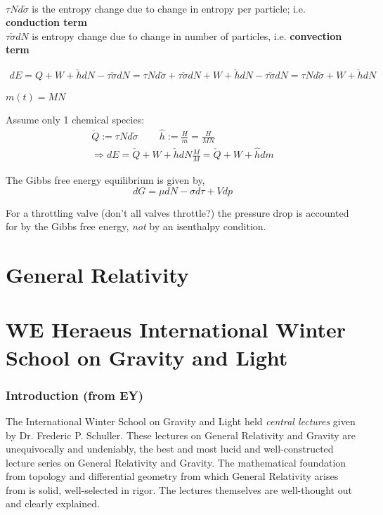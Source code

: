 \documentclass[10pt]{amsart}
\begin{document}
\begin{multicols*}{2}
\quad \\ 
$\tau N d\check{\sigma}$ is the entropy change due to change in entropy per particle; i.e. \textbf{conduction term} \\
$\tau \check{\sigma} dN$ is entropy change due to change in number of particles, i.e. \textbf{convection term}

\[
\begin{gathered}
dE = Q + W + \check{h} dN - \tau \check{\sigma} dN = \tau N d\check{\sigma} + \tau \check{\sigma} dN + W + \check{h} dN - \tau \check{\sigma} dN = \tau N d\check{\sigma} + W + \check{h} dN
\end{gathered}
\]

$m(t) = MN$

Assume only 1 chemical species:
\[
\begin{gathered}
	\check{Q} := \tau N d\check{\sigma} \qquad \, \widehat{h} := \frac{H}{m} = \frac{H}{MN} \\ 
 \Longrightarrow dE = \check{Q} + W + \check{h} dN \frac{M}{M} = \check{Q} + W + \widehat{h} dm
\end{gathered}
\]

The Gibbs free energy equilibrium is given by, 
\[
dG = \mu dN - \sigma d\tau + V dp
\]

For a throttling valve (don't all valves throttle?) the pressure drop is accounted for by the Gibbs free energy, \emph{not} by an isenthalpy condition. 

\part{General Relativity}

\part{WE Heraeus International Winter School on Gravity and Light}

\section*{Introduction (from EY)}

The International Winter School on Gravity and Light held \emph{central lectures} given by Dr. Frederic P. Schuller. These lectures on General Relativity and Gravity are unequivocally and undeniably, the best and most lucid and well-constructed lecture series on General Relativity and Gravity.  The mathematical foundation from topology and differential geometry from which General Relativity arises from is solid, well-selected in rigor.  The lectures themselves are well-thought out and clearly explained.  


\end{multicols*}
\end{document}
